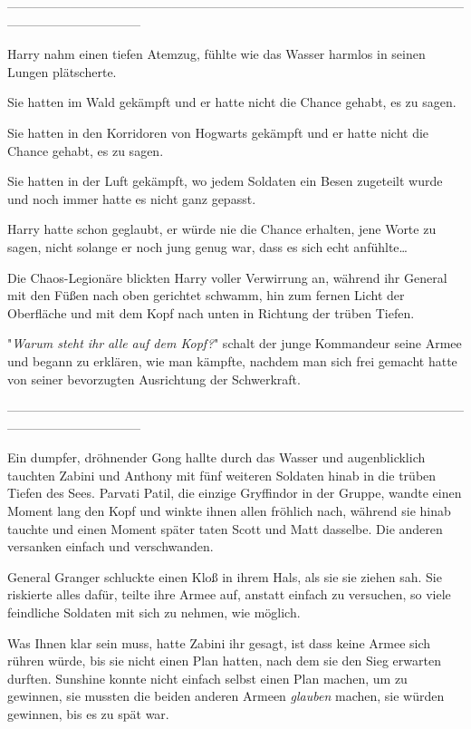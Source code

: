 {--------------------------------------------------------------------------------------------------------------------------------------------

Harry nahm einen tiefen Atemzug, fühlte wie das Wasser harmlos in seinen Lungen plätscherte.

Sie hatten im Wald gekämpft und er hatte nicht die Chance gehabt, es zu sagen.

Sie hatten in den Korridoren von Hogwarts gekämpft und er hatte nicht die Chance gehabt, es zu sagen.

Sie hatten in der Luft gekämpft, wo jedem Soldaten ein Besen zugeteilt wurde und noch immer hatte es nicht ganz gepasst.

Harry hatte schon geglaubt, er würde nie die Chance erhalten, jene Worte zu sagen, nicht solange er noch jung genug war, dass es sich echt anfühlte…

Die Chaos-Legionäre blickten Harry voller Verwirrung an, während ihr General mit den Füßen nach oben gerichtet schwamm, hin zum fernen Licht der Oberfläche und mit dem Kopf nach unten in Richtung der trüben Tiefen.

"\emph{Warum steht ihr} \emph{alle} \emph{auf dem Kopf?}" schalt der junge Kommandeur seine Armee und begann zu erklären, wie man kämpfte, nachdem man sich frei gemacht hatte von seiner bevorzugten Ausrichtung der Schwerkraft.

--------------------------------------------------------------------------------------------------------------------------------------------

Ein dumpfer, dröhnender Gong hallte durch das Wasser und augenblicklich tauchten Zabini und Anthony mit fünf weiteren Soldaten hinab in die trüben Tiefen des Sees. Parvati Patil, die einzige Gryffindor in der Gruppe, wandte einen Moment lang den Kopf und winkte ihnen allen fröhlich nach, während sie hinab tauchte und einen Moment später taten Scott und Matt dasselbe. Die anderen versanken einfach und verschwanden.

General Granger schluckte einen Kloß in ihrem Hals, als sie sie ziehen sah. Sie riskierte alles dafür, teilte ihre Armee auf, anstatt einfach zu versuchen, so viele feindliche Soldaten mit sich zu nehmen, wie möglich.

Was Ihnen klar sein muss, hatte Zabini ihr gesagt, ist dass keine Armee sich rühren würde, bis sie nicht einen Plan hatten, nach dem sie den Sieg erwarten durften. Sunshine konnte nicht einfach selbst einen Plan machen, um zu gewinnen, sie mussten die beiden anderen Armeen \emph{glauben} machen, sie würden gewinnen, bis es zu spät war.

}
